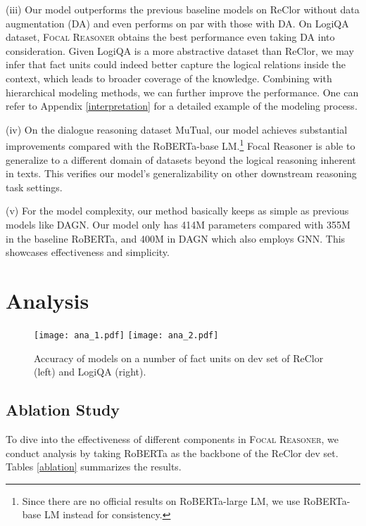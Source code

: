\documentclass[11pt]{article}
\begin{document}
(iii) Our model outperforms the previous baseline models on ReClor without data augmentation (DA) and even performs on par with those with DA. On LogiQA dataset, \textsc{Focal Reasoner} obtains the best performance even taking DA into consideration. Given LogiQA is a more abstractive dataset than ReClor, we may infer that fact units could indeed better capture the logical relations inside the context, which leads to broader coverage of the knowledge. Combining with hierarchical modeling methods, we can further improve the performance. One can refer to Appendix \ref{interpretation} for a detailed example of the modeling process.


(iv) On the dialogue reasoning dataset MuTual, our model achieves substantial improvements compared with the RoBERTa-base LM.\footnote{Since there are no official results on RoBERTa-large LM, we use RoBERTa-base LM instead for consistency.} Focal Reasoner is able to generalize to a different domain of datasets beyond the logical reasoning inherent in texts. This verifies our model's generalizability on other downstream reasoning task settings.

(v) For the model complexity, our method basically keeps as simple as previous models like DAGN. Our model only has 414M parameters compared with 355M in the baseline RoBERTa, and 400M in DAGN which also employs GNN. This showcases effectiveness and simplicity.

\section{Analysis}\label{sec:analysis}

\begin{figure*}
\vspace{-3mm}
  \begin{center}
    \texttt{[image: ana\_1.pdf]}
    \hspace{3mm}
    \texttt{[image: ana\_2.pdf]}
  \end{center}
  \caption{Accuracy of models on a number of fact units on dev set of ReClor (left) and LogiQA (right).}
  \label{fig:analysis_1}
\end{figure*}



\subsection{Ablation Study}
To dive into the effectiveness of different components in \textsc{Focal Reasoner}, we conduct analysis by taking RoBERTa as the backbone of the ReClor dev set. Tables \ref{ablation} summarizes the results. 
\end{document}
